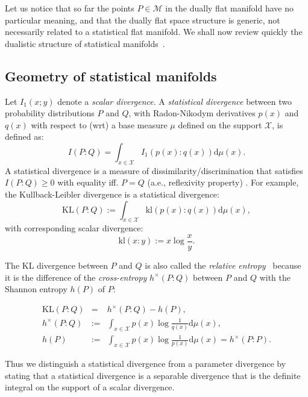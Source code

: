 \documentclass[graybox]{svmult}
\def\dmu{\mathrm{d}\mu}
\def\KL{\mathrm{KL}}
\def\kl{\mathrm{kl}}
\def\eqdef{:=}
\def\calX{\mathcal{X}}
\def\calM{\mathcal{M}}
\begin{document}
Let us notice that so far the points $P\in\calM$ in the dually flat manifold have no particular meaning, and that the dually flat space structure is generic, not necessarily related to a statistical flat manifold.
We shall now review quickly the dualistic structure of statistical manifolds~\cite{Lauritzen-1987}.


\subsection{Geometry of statistical manifolds}\label{sec:geosf}
Let $I_1(x;y)$ denote a {\em scalar divergence}.
A {\em statistical divergence}  between two probability distributions $P$ and $Q$, with Radon-Nikodym derivatives $p(x)$ and $q(x)$ with respect to (wrt)  a base measure $\mu$ defined on the support $\calX$, is defined as:
\begin{equation}
I(P:Q)=\int_{x\in\calX} I_1\left(p(x):q(x)\right) \dmu(x).
\end{equation}
A  statistical divergence is a measure of dissimilarity/discrimination that satisfies $I(P:Q)\geq 0$ with equality iff. $P=Q$ (a.e., reflexivity property) . 
For example, the Kullback-Leibler divergence is a statistical divergence:
\begin{equation}
\KL(P:Q)\eqdef \int_{x\in\calX} \kl(p(x):q(x)) \dmu(x),
\end{equation}
with corresponding scalar divergence:
\begin{equation}
\kl(x:y) \eqdef x\log\frac{x}{y}.
\end{equation}

The KL divergence between $P$ and $Q$ is also called the {\em relative entropy}~\cite{Cover-2012} because it is the difference of the 
{\em cross-entropy} $h^\times(P:Q)$ between $P$ and $Q$ with the {Shannon entropy} $h(P)$ of $P$:
 
\begin{eqnarray}
\KL(P:Q) &=& h^\times(P:Q)-h(P),\\
h^\times(P:Q) &\eqdef &\int_{x\in\calX} p(x)\log \frac{1}{q(x)} \dmu(x),\\
h(P) &\eqdef& \int_{x\in\calX} p(x)\log \frac{1}{p(x)} \dmu(x)= h^\times(P:P).
\end{eqnarray}

Thus we distinguish a statistical divergence from a parameter divergence by stating that   a statistical divergence is a separable divergence that is the definite integral on the support of a scalar divergence.
\end{document}
